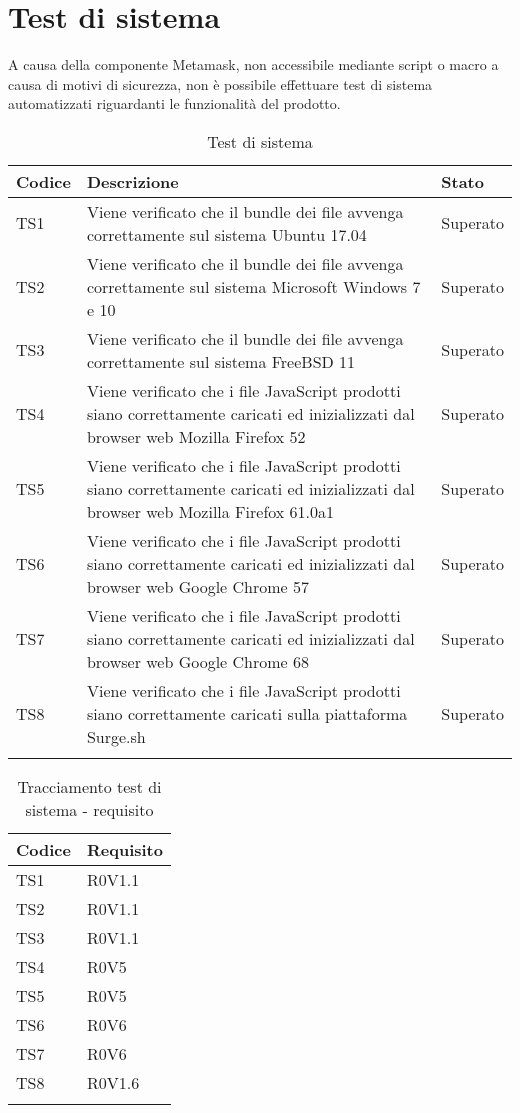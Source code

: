 \documentclass[PianoDiQualifica.tex]{subfiles}
\begin{document}
\chapter{Test di sistema}
A causa della componente Metamask, non accessibile mediante script o macro a causa di motivi di sicurezza, non è possibile effettuare test di sistema automatizzati riguardanti le funzionalità del prodotto. \\

\begin{longtable}[H]{P{2cm}P{8.5cm}P{3cm}}
	\color{CHeaderText}\textbf{Codice} & 
	\color{CHeaderText}\textbf{Descrizione} & 
	\color{CHeaderText}\textbf{Stato}\\
	\endhead
	TS1 & Viene verificato che il bundle dei file avvenga correttamente sul sistema Ubuntu 17.04 & Superato \\ 
	TS2 & Viene verificato che il bundle dei file avvenga correttamente sul sistema Microsoft Windows 7 e 10 & Superato \\ 
	TS3 & Viene verificato che il bundle dei file avvenga correttamente sul sistema FreeBSD 11 & Superato \\ 
	TS4 & Viene verificato che i file JavaScript prodotti siano correttamente caricati ed inizializzati dal browser web Mozilla Firefox 52 & Superato \\ 
	TS5 & Viene verificato che i file JavaScript prodotti siano correttamente caricati ed inizializzati dal browser web Mozilla Firefox 61.0a1 & Superato \\ 
	TS6 & Viene verificato che i file JavaScript prodotti siano correttamente caricati ed inizializzati dal browser web Google Chrome 57 & Superato \\ 
	TS7 & Viene verificato che i file JavaScript prodotti siano correttamente caricati ed inizializzati dal browser web Google Chrome 68 & Superato \\ 
	TS8 & Viene verificato che i file JavaScript prodotti siano correttamente caricati sulla piattaforma Surge.sh & Superato \\ 
	\hiderowcolors
	\caption{Test di sistema}
\end{longtable}

\begin{longtable}[H]{P{6.5cm}P{7cm}}
	\color{CHeaderText}\textbf{Codice} & 
	\color{CHeaderText}\textbf{Requisito} \\
	\endhead
	TS1 & R0V1.1 \\ 
	TS2 & R0V1.1 \\ 
	TS3 & R0V1.1 \\ 
	TS4 & R0V5 \\ 
	TS5 & R0V5 \\ 
	TS6 & R0V6 \\ 
	TS7 & R0V6 \\ 
	TS8 & R0V1.6 \\  
	\hiderowcolors
	\caption{Tracciamento test di sistema - requisito}
\end{longtable}
\end{document}
